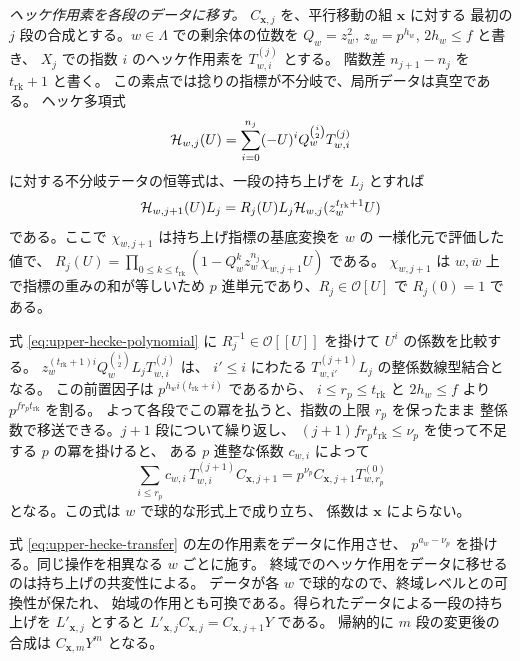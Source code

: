 \emph{ヘッケ作用素を各段のデータに移す。}
\(C_{\boldsymbol x,j}\) を、平行移動の組 \(\boldsymbol x\) に対する
最初の \(j\) 段の合成とする。\(w\in\Lambda\) での剰余体の位数を
\(Q_w=z_w^2\), \(z_w=p^{h_w}\), \(2h_w\le f\) と書き、
\(X_j\) での指数 \(i\) のヘッケ作用素を \(T_{w,i}^{(j)}\) とする。
階数差 \(n_{j+1}-n_j\) を \(t_\mathrm{rk}+1\) と書く。
この素点では捻りの指標が不分岐で、局所データは真空である。
ヘッケ多項式
\[
 {\cal H}_{w,j}(U)=\sum_{i=0}^{n_j}(-U)^i Q_w^{\binom{i}{2}}T_{w,i}^{(j)}
\]
に対する不分岐テータの恒等式は、一段の持ち上げを \(L_j\) とすれば
\begin{equation}\label{eq:upper-hecke-polynomial}
 {\cal H}_{w,j+1}(U)L_j
    =R_j(U)L_j{\cal H}_{w,j}(z_w^{t_\mathrm{rk}+1}U)
\end{equation}
である。ここで \(\chi_{w,j+1}\) は持ち上げ指標の基底変換を \(w\) の
一様化元で評価した値で、
\(R_j(U)=\prod_{0\le k\le t_\mathrm{rk}}(1-Q_w^k z_w^{n_j}\chi_{w,j+1}U)\) である。
\(\chi_{w,j+1}\) は \(w,\overline w\) 上で指標の重みの和が等しいため
\(p\) 進単元であり、\(R_j\in\mathcal O[U]\) で \(R_j(0)=1\) である。

式 \eqref{eq:upper-hecke-polynomial} に \(R_j^{-1}\in\mathcal O[[U]]\)
を掛けて \(U^i\) の係数を比較する。
\(z_w^{(t_\mathrm{rk}+1)i}Q_w^{\binom{i}{2}} L_j T_{w,i}^{(j)}\) は、
\(i'\le i\) にわたる \(T_{w,i'}^{(j+1)}L_j\) の整係数線型結合となる。
この前置因子は \(p^{h_w i(t_\mathrm{rk}+i)}\) であるから、
\(i\le r_p\le t_\mathrm{rk}\) と \(2h_w\le f\) より
\(p^{f r_p t_\mathrm{rk}}\) を割る。
よって各段でこの冪を払うと、指数の上限 \(r_p\) を保ったまま
整係数で移送できる。\(j+1\) 段について繰り返し、
\((j+1)f r_p t_\mathrm{rk}\le \nu_p\) を使って不足する \(p\) の冪を掛けると、
ある \(p\) 進整な係数 \(c_{w,i}\) によって
\begin{equation}\label{eq:upper-hecke-transfer}
 \sum_{i\le r_p}c_{w,i}\,T_{w,i}^{(j+1)}C_{\boldsymbol x,j+1}
       = p^{\nu_p} C_{\boldsymbol x,j+1} T_{w,r_p}^{(0)}
\end{equation}
となる。この式は \(w\) で球的な形式上で成り立ち、
係数は \(\boldsymbol x\) によらない。

式 \eqref{eq:upper-hecke-transfer} の左の作用素をデータに作用させ、
\(p^{a_w-\nu_p}\) を掛ける。同じ操作を相異なる \(w\) ごとに施す。
終域でのヘッケ作用をデータに移せるのは持ち上げの共変性による。
データが各 \(w\) で球的なので、終域レベルとの可換性が保たれ、
始域の作用とも可換である。得られたデータによる一段の持ち上げを
\(L'_{\boldsymbol x,j}\) とすると
\(L'_{\boldsymbol x,j}C_{\boldsymbol x,j}
 =C_{\boldsymbol x,j+1}Y\) である。
帰納的に \(m\) 段の変更後の合成は \(C_{\boldsymbol x,m}Y^m\) となる。

